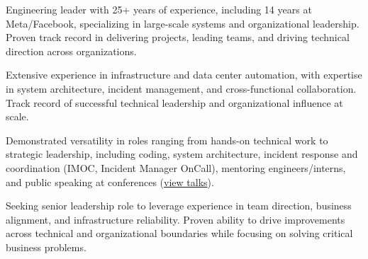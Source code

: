 

\begin{cvparagraph}

    Engineering leader with 25+ years of experience, including 14 years at Meta/Facebook,
    specializing in large-scale systems and organizational leadership. Proven track record
    in delivering projects, leading teams, and driving technical direction across organizations.

    Extensive experience in infrastructure and data center automation,
    with expertise in
    system architecture, incident management, and cross-functional collaboration.
    Track record of successful technical leadership and organizational influence at scale.

    Demonstrated versatility in roles ranging from hands-on technical work to strategic
    leadership, including coding, system architecture, incident response and coordination (IMOC, Incident Manager OnCall),
    mentoring engineers/interns, and public speaking at conferences (\href{https://www.angelofailla.com/public_talks/}{view talks}).

    Seeking senior leadership role to leverage experience in team direction, business alignment,
    and infrastructure reliability. Proven ability to drive improvements across technical
    and organizational boundaries while focusing on solving critical business problems.
\end{cvparagraph}